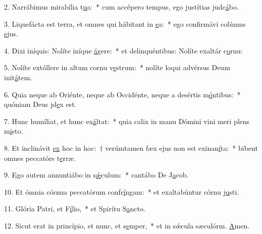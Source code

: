 2. Narrábimus mirabília t\uline{u}a:~* cum accépero tempus, ego justítias judc\uline{á}bo.\par 
3. Liquefácta est terra, et omnes qui hábitant in \uline{e}a:~* ego confirmávi colúmns \uline{e}jus.\par 
4. Dixi iníquis: Nolíte iníque \uline{á}gere:~* et delinquéntibus: Nolíte exaltár c\uline{o}rnu:\par 
5. Nolíte extóllere in altum cornu v\uline{e}strum:~* nolíte loqui advérsus Deum init\uline{á}tem.\par 
6. Quia neque ab Oriénte, neque ab Occidénte, neque a desértis m\uline{ó}ntibus:~* quóniam Deus jd\uline{e}x est.\par 
7. Hunc humíliat, et hunc ex\uline{á}ltat:~* quia calix in manu Dómini vini meri plens m\uline{i}sto.\par 
8. Et inclinávit \uline{ex} hoc in hoc:~† verúmtamen fæx ejus non est exinan\uline{í}ta:~* bibent omnes peccatórs t\uline{e}rræ.\par 
9. Ego autem annuntiábo in s\uline{ǽ}culum:~* cantábo De J\uline{a}cob.\par 
10. Et ómnia córnua peccatórum confr\uline{í}ngam:~* et exaltabúntur córnu j\uline{u}sti.\par 
11. Glória Patri, et F\uline{í}lio,~* et Spirítu S\uline{a}ncto.\par 
12. Sicut erat in princípio, et nunc, et s\uline{e}mper,~* et in sǽcula sæculórm. \uline{A}men.\par 

